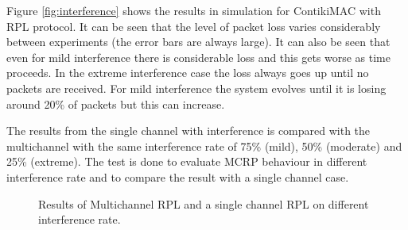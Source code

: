 Figure \ref{fig:interference} shows the results in simulation for ContikiMAC with RPL protocol. It can be seen that the level of packet loss varies considerably between experiments (the error bars are always large). It can also be seen that even for mild interference there is considerable loss and this gets worse as time proceeds. In the extreme interference case the loss always goes up until no packets are received. For mild interference the system evolves until it is losing around 20\% of packets but this can increase.

The results from the single channel with interference is compared with the multichannel with the same interference rate of 75\% (mild), 50\% (moderate) and 25\% (extreme). The test is done to evaluate MCRP behaviour in different interference rate and to compare the result with a single channel case. 

\begin{figure}
\centering
{}                
\caption{Results of Multichannel RPL and a single channel RPL on different interference rate.}
\label{fig:sminterference}
\end{figure}

